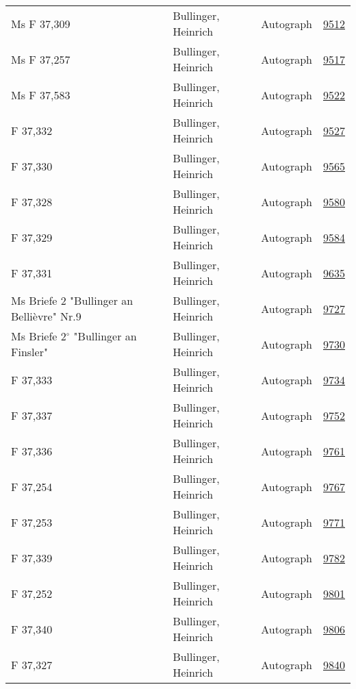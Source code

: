 \documentclass[10pt,a4paper,landscape]{report}
\begin{document}
\begin{longtable}{p{16cm}p{4cm}lr}
Ms F 37,309	&	Bullinger, Heinrich	&	Autograph	&	\href{http://130.60.24.72/assignment/9512}{9512}\\
Ms F 37,257	&	Bullinger, Heinrich	&	Autograph	&	\href{http://130.60.24.72/assignment/9517}{9517}\\
Ms F 37,583	&	Bullinger, Heinrich	&	Autograph	&	\href{http://130.60.24.72/assignment/9522}{9522}\\
F 37,332	&	Bullinger, Heinrich	&	Autograph	&	\href{http://130.60.24.72/assignment/9527}{9527}\\
F 37,330	&	Bullinger, Heinrich	&	Autograph	&	\href{http://130.60.24.72/assignment/9565}{9565}\\
F 37,328	&	Bullinger, Heinrich	&	Autograph	&	\href{http://130.60.24.72/assignment/9580}{9580}\\
F 37,329	&	Bullinger, Heinrich	&	Autograph	&	\href{http://130.60.24.72/assignment/9584}{9584}\\
F 37,331	&	Bullinger, Heinrich	&	Autograph	&	\href{http://130.60.24.72/assignment/9635}{9635}\\
Ms Briefe 2 "Bullinger an Bellièvre" Nr.9	&	Bullinger, Heinrich	&	Autograph	&	\href{http://130.60.24.72/assignment/9727}{9727}\\
Ms Briefe 2$^\circ$ "Bullinger an Finsler"	&	Bullinger, Heinrich	&	Autograph	&	\href{http://130.60.24.72/assignment/9730}{9730}\\
F 37,333	&	Bullinger, Heinrich	&	Autograph	&	\href{http://130.60.24.72/assignment/9734}{9734}\\
F 37,337	&	Bullinger, Heinrich	&	Autograph	&	\href{http://130.60.24.72/assignment/9752}{9752}\\
F 37,336	&	Bullinger, Heinrich	&	Autograph	&	\href{http://130.60.24.72/assignment/9761}{9761}\\
F 37,254	&	Bullinger, Heinrich	&	Autograph	&	\href{http://130.60.24.72/assignment/9767}{9767}\\
F 37,253	&	Bullinger, Heinrich	&	Autograph	&	\href{http://130.60.24.72/assignment/9771}{9771}\\
F 37,339	&	Bullinger, Heinrich	&	Autograph	&	\href{http://130.60.24.72/assignment/9782}{9782}\\
F 37,252	&	Bullinger, Heinrich	&	Autograph	&	\href{http://130.60.24.72/assignment/9801}{9801}\\
F 37,340	&	Bullinger, Heinrich	&	Autograph	&	\href{http://130.60.24.72/assignment/9806}{9806}\\
F 37,327	&	Bullinger, Heinrich	&	Autograph	&	\href{http://130.60.24.72/assignment/9840}{9840}\\

\end{longtable}
\end{document}
